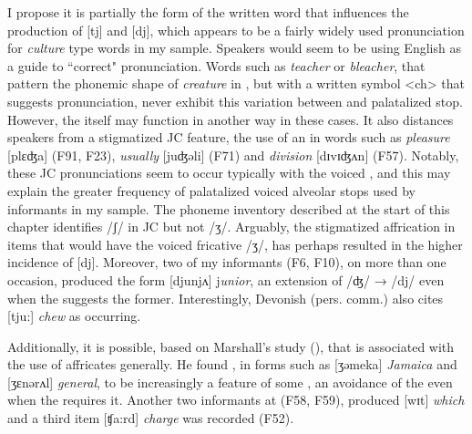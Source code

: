   I propose it is partially the form of the written word that influences the production of [tj] and [dj], which appears to be a fairly widely used pronunciation for \textit{culture} type words in my sample.  Speakers would seem to be using English  as a guide to ``correct" pronunciation.  Words such as \textit{teacher} or \textit{bleacher}, that pattern the phonemic shape of \textit{creature} in , but with a written symbol <ch> that suggests  pronunciation, never exhibit this variation between  and palatalized stop.  However, the  itself may function in another way in these cases.  It also distances speakers from a stigmatized JC feature, the use of an  in words such as \textit{pleasure} [plɛʤa] (F91, F23), \textit{usually} [juʤǝli] (F71) and \textit{division} [dɪvɪʤʌn] (F57).  Notably, these JC pronunciations seem to occur typically with the voiced , and this may explain the greater frequency of palatalized voiced alveolar stops used by informants in my sample.  The phoneme inventory described at the start of this chapter identifies /ʃ/ in JC but not /ʒ/.  Arguably, the stigmatized affrication in  items that would have the voiced fricative /ʒ/, has perhaps resulted in the higher incidence of [dj].  Moreover, two of my informants (F6, F10), on more than one occasion, produced the form [djunjʌ] j\textit{unior}, an extension of /ʤ/ → /dj/ even when the  suggests the former.  Interestingly, Devonish (pers. comm.) also cites [tju:] \textit{chew} as occurring. 

Additionally, it is possible, based on Marshall's study (\citeyear{Marshall1983}), that  is associated with the use of affricates generally.  He found , in forms such as [ʒǝmeka] \textit{Jamaica} and [ʒɛnǝrʌl] \textit{general}, to be increasingly a feature of some , an avoidance of the  even when the  requires it.  Another two informants at  (F58, F59), produced [wɪt] \textit{which} and a third item [ʧa:rd] \textit{charge} was recorded (F52).\largerpage[-2]  

